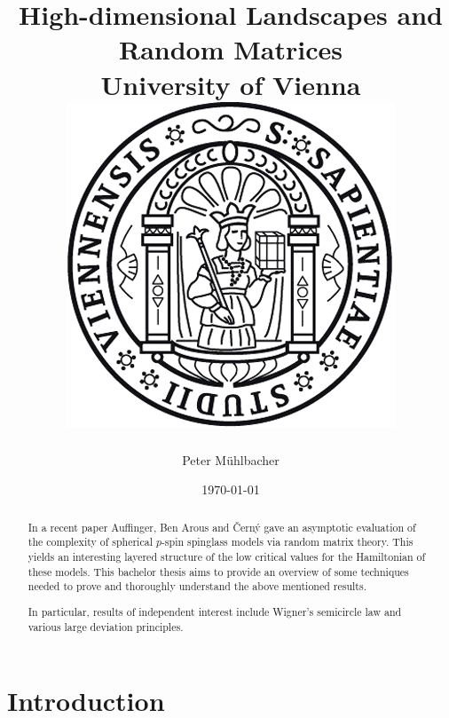 \documentclass[11pt]{report}
\begin{document}
\title{
	{High-dimensional Landscapes and Random Matrices}\\
	{\large University of Vienna}\\
	\vspace{2ex}
	{\includegraphics{university.png}}
}
\author{Peter Mühlbacher}
\date{\today}
\maketitle

\begin{abstract}
In a recent paper Auffinger, Ben Arous and {\v{C}}ern{\'y} gave an asymptotic evaluation of the complexity of spherical $p$-spin spinglass models via random matrix theory. This yields an interesting layered structure of the low critical values for the Hamiltonian of these models. This bachelor thesis aims to provide an overview of some techniques needed to prove and thoroughly understand the above mentioned results.

In particular, results of independent interest include Wigner's semicircle law and various large deviation principles.
\end{abstract}

\tableofcontents

\chapter*{Introduction}








\end{document}
